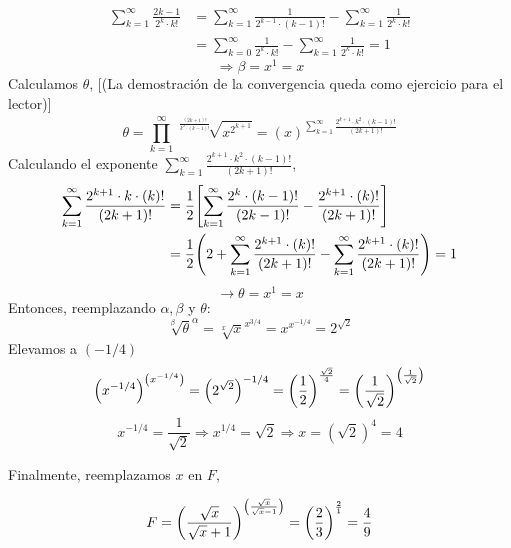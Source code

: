 {\begin{align*}
	\sum_{k=1}^{\infty} \frac{2k - 1}{2^k \cdot k!}
	 & = \sum_{k=1}^\infty \frac{1}{2^{k-1} \cdot (k-1)!} - \sum_{k=1}^\infty \frac{1}{2^k \cdot k!} \\
	 & = \sum_{k=0}^\infty \frac{1}{2^k \cdot k!} - \sum_{k=1}^\infty \frac{1}{2^k \cdot k!}  = 1
\end{align*}
$$
	\Rightarrow \beta =x^{1}=x
$$
Calculamos $\theta$, [{\small(La demostración de la convergencia queda como ejercicio para el lector)}]
\[
	\theta = \prod_{k=1}^\infty  \sqrt[\frac{(2k+1)!}{k^2 \cdot (k-1)!} \;\;\; ]{ \displaystyle x^{2^{k+1}}}  = (x)^{\sum_{k=1}^\infty \frac{2^{k+1}\cdot k^2 \cdot (k-1)!}{ (2k+1)!}}
\]
Calculando  el exponente  $ \sum_{k=1}^\infty \frac{2^{k+1}\cdot k^2 \cdot (k-1)!}{ (2k+1)!}$,
\begin{align*}
	\sum_{k=1}^\infty \frac{2^{k+1}\cdot k  \cdot (k )!}{ (2k+1)!} & =\frac{1}{2}\bqty{   \sum_{k=1}^\infty \frac{2^{k}  \cdot (k-1 )!}{ (2k-1)!}- \frac{2^{k+1}\cdot   (k )!}{ (2k+1)!}}                      \\
	                                                               & =\frac{1}{2}\pqty{2+\sum_{k=1}^\infty \frac{2^{k+1}\cdot   (k )!}{ (2k+1)!} - \sum_{k=1}^\infty \frac{2^{k+1}\cdot   (k )!}{ (2k+1)!} }=1
\end{align*}
$$
	\rightarrow \theta = x ^1 = x
$$
Entonces, reemplazando $\alpha, \beta $ y $\theta$:
$$
	\sqrt[\beta]{\theta}^{\alpha} =\sqrt[x]{x}^{x^{3/4}} = x^{x^{-1/4}} =2^{\sqrt{2}}
$$
Elevamos a $(-1/4)$
$$
	\pqty{x^{-1/4}}^{\pqty{ x^{-1/4}}} = \pqty{2^{\sqrt{2}} }^{-1/4}= \pqty{\frac{1}{2}}^{\frac{\sqrt{2}}{4}}= \pqty{\frac{1}{\sqrt{2}}}^{\pqty{\frac{1}{\sqrt{2}}}}
$$
$$
	x^{-1/4} = \frac{1}{\sqrt{2}} \Rightarrow x^{1/4} = \sqrt{2} \Rightarrow x = (\sqrt{2})^4 = 4
$$

Finalmente, reemplazamos $x$ en $F$,
}

\begin{LnxRptaBox}
	\[
		F= \pqty{\frac{\sqrt{x}}{\sqrt{x}+1}}^{\pqty{\frac{\sqrt{x}}{\sqrt{x}-1}}} = \pqty{\frac{2}{3}}^{\frac{2}{1}}= \frac{4}{9}
	\]
\end{LnxRptaBox}
